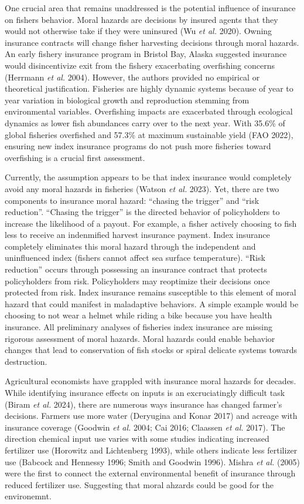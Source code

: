 \documentclass[
  letterpaper,
  DIV=11,
  numbers=noendperiod]{scrartcl}
\theoremstyle{plain}
\theoremstyle{plain}
\theoremstyle{remark}
\begin{document}
One crucial area that remains unaddressed is the potential influence of
insurance on fishers behavior. Moral hazards are decisions by insured
agents that they would not otherwise take if they were uninsured (Wu
\emph{et al.} 2020). Owning insurance contracts will change fisher
harvesting decisions through moral hazards. An early fishery insurance
program in Bristol Bay, Alaska suggested insurance would disincentivize
exit from the fishery exacerbating overfishing concerns (Herrmann
\emph{et al.} 2004). However, the authors provided no empirical or
theoretical justification. Fisheries are highly dynamic systems because
of year to year variation in biological growth and reproduction stemming
from environmental variables. Overfishing impacts are exacerbated
through ecological dynamics as lower fish abundances carry over to the
next year. With 35.6\% of global fisheries overfished and 57.3\% at
maximum sustainable yield (FAO 2022), ensuring new index insurance
programs do not push more fisheries toward overfishing is a crucial
first assessment.

Currently, the assumption appears to be that index insurance would
completely avoid any moral hazards in fisheries (Watson \emph{et al.}
2023). Yet, there are two components to insurance moral hazard:
``chasing the trigger'' and ``risk reduction''. ``Chasing the trigger''
is the directed behavior of policyholders to increase the likelihood of
a payout. For example, a fisher actively choosing to fish less to
receive an indenmified harvest insurance payment. Index insurance
completely eliminates this moral hazard through the independent and
uninfluenced index (fishers cannot affect sea surface temperature).
``Risk reduction'' occurs through possessing an insurance contract that
protects policyholders from risk. Policyholders may reoptimize their
decisions once protected from risk. Index insurance remains susceptible
to this element of moral hazard that could manifest in maladaptive
behaviors. A simple example would be choosing to not wear a helmet while
riding a bike because you have health insurance. All preliminary
analyses of fisheries index insurance are missing rigorous assessment of
moral hazards. Moral hazards could enable behavior changes that lead to
conservation of fish stocks or spiral delicate systems towards
destruction.

Agricultural economists have grappled with insurance moral hazards for
decades. While identifying insurance effects on inputs is an
excruciatingly difficult task (Biram \emph{et al.} 2024), there are
numerous ways insurance has changed farmer's decisions. Farmers use more
water (Deryugina and Konar 2017) and acreage with insurance coverage
(Goodwin \emph{et al.} 2004; Cai 2016; Claassen \emph{et al.} 2017). The
direction chemical input use varies with some studies indicating
increased fertilizer use (Horowitz and Lichtenberg 1993), while others
indicate less fertilizer use (Babcock and Hennessy 1996; Smith and
Goodwin 1996). Mishra \emph{et al.} (2005) were the first to connect the
external environmental benefit of insurance through reduced fertilizer
use. Suggesting that moral ahzards could be good for the environemnt.
\end{document}

